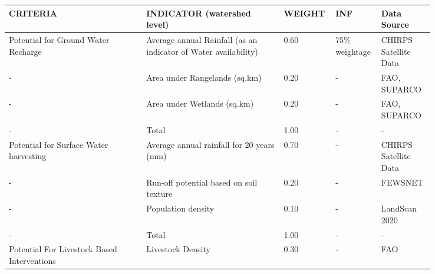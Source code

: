 \begin{longtable}{| p{0.3\linewidth} | p{0.3\linewidth} | p{0.07\linewidth} | p{0.07\linewidth} |p{0.1\linewidth} | }
    \hline
    CRITERIA                                                                                       & INDICATOR (watershed level)                                     & WEIGHT & INF            & Data Source           \\
    \hline
    Potential for Ground Water Recharge                                                            & Average annual Rainfall (as an indicator of Water availability) & 0.60 & 75\% weightage & CHIRPS Satellite Data  \\
    -                                                                                              & Area under Rangelands (sq.km)                                   & 0.20   & -              & FAO, SUPARCO          \\
    -                                                                                              & Area under Wetlands (sq.km)                                     & 0.20   & -              & FAO, SUPARCO          \\
    -                                                                                              & Total                                                           & 1.00   & -              & -                     \\
    Potential for Surface Water harvesting                                                         & Average annual rainfall for 20 years (mm)                       & 0.70   & -              & CHIRPS Satellite Data \\
    -                                                                                              & Run-off potential based on soil texture                         & 0.20   & -              & FEWSNET               \\
    -                                                                                              & Population density                                              & 0.10   & -              & LandScan 2020         \\
    -                                                                                              & Total                                                           & 1.00   & -              & -                     \\
    Potential For Livestock Based Interventions                                                    & Livestock Density                                               & 0.30   & -              & FAO                   \\

\end{longtable}
